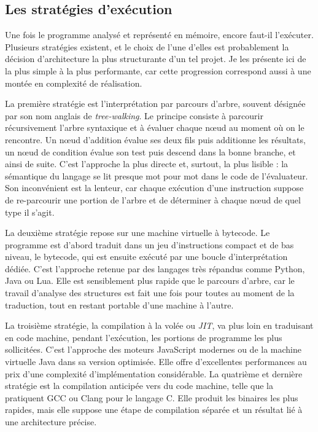 \subsection{Les stratégies d'exécution}

Une fois le programme analysé et représenté en mémoire, encore faut-il l'exécuter.
Plusieurs stratégies existent, et le choix de l'une d'elles est probablement la
décision d'architecture la plus structurante d'un tel projet. Je les présente ici
de la plus simple à la plus performante, car cette progression correspond aussi à
une montée en complexité de réalisation.

La première stratégie est l'interprétation par parcours d'arbre, souvent désignée
par son nom anglais de \emph{tree-walking}. Le principe consiste à parcourir
récursivement l'arbre syntaxique et à évaluer chaque n\oe ud au moment où on le
rencontre. Un n\oe ud d'addition évalue ses deux fils puis additionne les
résultats, un n\oe ud de condition évalue son test puis descend dans la bonne
branche, et ainsi de suite. C'est l'approche la plus directe et, surtout, la plus
lisible : la sémantique du langage se lit presque mot pour mot dans le code de
l'évaluateur. Son inconvénient est la lenteur, car chaque exécution d'une
instruction suppose de re-parcourir une portion de l'arbre et de déterminer à
chaque n\oe ud de quel type il s'agit.

La deuxième stratégie repose sur une machine virtuelle à bytecode. Le programme
est d'abord traduit dans un jeu d'instructions compact et de bas niveau, le
bytecode, qui est ensuite exécuté par une boucle d'interprétation dédiée. C'est
l'approche retenue par des langages très répandus comme Python, Java ou Lua. Elle
est sensiblement plus rapide que le parcours d'arbre, car le travail d'analyse des
structures est fait une fois pour toutes au moment de la traduction, tout en
restant portable d'une machine à l'autre.

La troisième stratégie, la compilation à la volée ou \emph{JIT}, va plus loin en
traduisant en code machine, pendant l'exécution, les portions de programme les
plus sollicitées. C'est l'approche des moteurs JavaScript modernes ou de la
machine virtuelle Java dans sa version optimisée. Elle offre d'excellentes
performances au prix d'une complexité d'implémentation considérable. La quatrième
et dernière stratégie est la compilation anticipée vers du code machine, telle que
la pratiquent GCC ou Clang pour le langage C. Elle produit les binaires les plus
rapides, mais elle suppose une étape de compilation séparée et un résultat lié à
une architecture précise.

